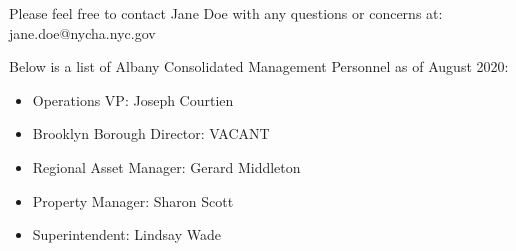 {    Please feel free to contact Jane Doe with any questions or concerns at: jane.doe@nycha.nyc.gov

    Below is a list of Albany Consolidated Management Personnel as of August 2020:
    \begin{itemize}
    \item Operations VP: Joseph Courtien
    \item Brooklyn Borough Director: VACANT
    \item Regional Asset Manager: Gerard Middleton
    \item Property Manager: Sharon Scott
    \item Superintendent: Lindsay Wade
    \end{itemize}
    }